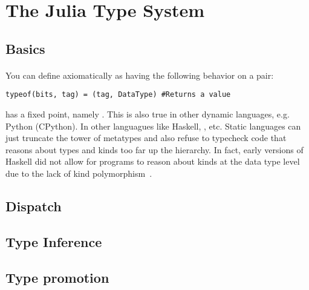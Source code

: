 \section{The Julia Type System}

\subsection{Basics}

\paragraph{}

You can define  axiomatically as having the following behavior on a  pair:

\begin{verbatim}
typeof(bits, tag) = (tag, DataType) #Returns a value
\end{verbatim}

 has a fixed point, namely . This is also true in other dynamic languages, e.g. Python (CPython). In other languagues like Haskell, , etc. Static languages can just truncate the tower of metatypes and also refuse to typecheck code that reasons about types and kinds too far up the hierarchy. In fact, early versions of Haskell did not allow for programs to reason about kinds at the data type level due to the lack of kind polymorphism~\cite{haskellkindtypes}.


\subsection{Dispatch}

\subsection{Type Inference}


\subsection{Type promotion}

